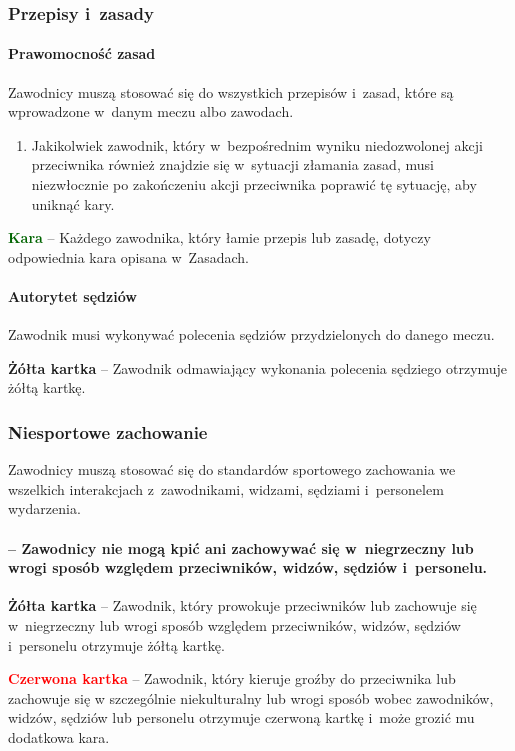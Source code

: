 \documentclass[12pt,a4paper]{article}
\newcommand\redcard[1]{\bgroup\textcolor{red}{\textbf{#1}}}
\newcommand\yellowcard[1]{\bgroup\textcolor{darkyellow}{\textbf{#1}}}
\newcommand\other[1]{\bgroup\textcolor{darkgreen}{\textbf{#1}}}
\begin{document}
\subsubsection{Przepisy i~zasady}

\paragraph{Prawomocność zasad}
Zawodnicy muszą stosować się do
wszystkich przepisów i~zasad, które są wprowadzone w~danym meczu albo
zawodach.
\begin{enumerate}
	\item Jakikolwiek zawodnik, który w~bezpośrednim wyniku niedozwolonej akcji
	      przeciwnika również znajdzie się w~sytuacji złamania zasad, musi
	      niezwłocznie po zakończeniu akcji przeciwnika poprawić tę sytuację, aby
	      uniknąć kary.
\end{enumerate}

\other{Kara} -- Każdego zawodnika, który łamie przepis lub zasadę, dotyczy
odpowiednia kara opisana w~Zasadach.

\paragraph{Autorytet sędziów}
Zawodnik musi wykonywać polecenia
sędziów przydzielonych do danego meczu.

\yellowcard{Żółta kartka} -- Zawodnik odmawiający wykonania polecenia sędziego
otrzymuje żółtą kartkę.

\subsubsection{Niesportowe zachowanie}

Zawodnicy muszą stosować się do standardów sportowego zachowania we
wszelkich interakcjach z~zawodnikami, widzami, sędziami i~personelem
wydarzenia.

\paragraph{-- Zawodnicy nie mogą kpić ani zachowywać się w~niegrzeczny lub wrogi sposób względem przeciwników, widzów, sędziów i~personelu.}

\yellowcard{Żółta kartka} -- Zawodnik, który prowokuje przeciwników lub zachowuje się w~niegrzeczny
lub wrogi sposób względem przeciwników, widzów, sędziów i~personelu
otrzymuje żółtą kartkę.

\redcard{Czerwona kartka} -- Zawodnik, który kieruje groźby do przeciwnika lub zachowuje się w szczególnie niekulturalny lub wrogi
sposób wobec zawodników, widzów, sędziów lub personelu otrzymuje
czerwoną kartkę i~może grozić mu dodatkowa kara.
\end{document}
